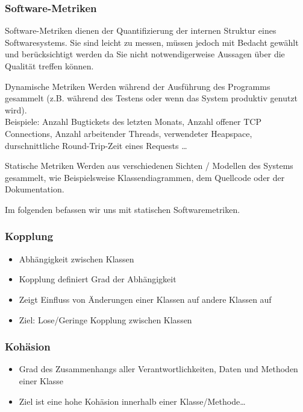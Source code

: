\begin{frame}
\frametitle{Software-Metriken}
	Software-Metriken dienen der Quantifizierung der internen Struktur eines Softwaresystems.
	Sie sind leicht zu messen, müssen jedoch mit Bedacht gewählt und berücksichtigt werden
	da Sie nicht notwendigerweise Aussagen über die Qualität treffen können.
	\scriptsize
	\begin{block}{Dynamische Metriken}
		Werden während der Ausführung des Programms gesammelt (z.B. während des Testens oder wenn
		das System produktiv genutzt wird). \\
		Beispiele: Anzahl Bugtickets des letzten Monats, Anzahl offener TCP Connections, Anzahl arbeitender Threads,
		verwendeter Heapspace, durschnittliche Round-Trip-Zeit eines Requests \ldots
	\end{block}
	\begin{block}{Statische Metriken}
		Werden aus verschiedenen Sichten / Modellen des Systems gesammelt, wie Beispielsweise Klassendiagrammen,
		dem Quellcode oder der Dokumentation.
	\end{block}
	\normalsize
	Im folgenden befassen wir uns mit statischen Softwaremetriken.
\end{frame}

\begin{frame}[fragile]
	\frametitle{Kopplung}
		\begin{itemize}
		  \item Abh\"angigkeit zwischen Klassen
		  \item Kopplung definiert Grad der Abh\"angigkeit
		  \item Zeigt Einfluss von \"Anderungen einer Klassen
		  auf andere Klassen auf
		  \item Ziel: Lose/Geringe Kopplung zwischen Klassen
		\end{itemize}
\end{frame}

\begin{frame}[fragile]
	\frametitle{Koh\"asion}
		\begin{itemize}
		  \item Grad des Zusammenhangs aller Verantwortlichkeiten, Daten und
		  Methoden einer Klasse
		  \item Ziel ist eine hohe Koh\"asion innerhalb einer Klasse/Methode\ldots
		\end{itemize}
\end{frame}

